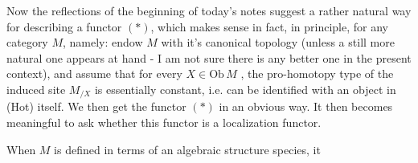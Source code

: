 Now the reflections of the beginning of today's notes  
suggest a rather natural way for describing a functor $(*)$,  which makes
sense in fact,  in principle,  for any category $M$,  namely:  endow $M$ with
it's canonical topology (unless a still more natural one appears at hand
-  I am not sure there is any better one in the present context),  and
assume that for every  $X\in \mathrm{Ob}\, M$ ,  the pro-homotopy type of the induced
site  $M_{/X}$  is essentially constant,  i.e. can be identified with an
object in (Hot) itself.  We then get the functor $(*)$ in an obvious way.
It then becomes meaningful to ask whether this functor is a localization
functor.

When $M$ is defined in terms of an algebraic structure species,  it

